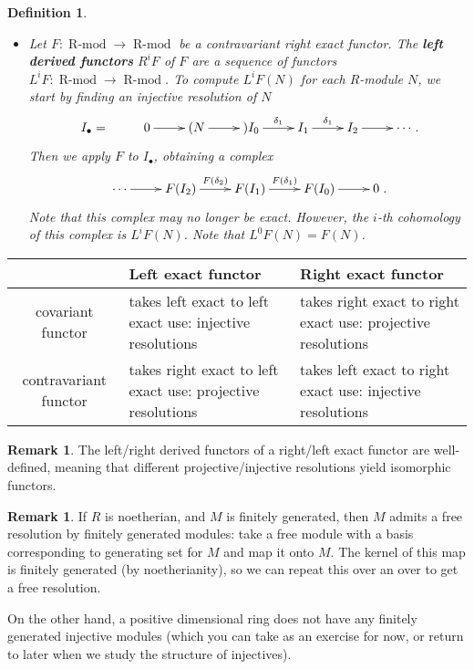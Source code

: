 \documentclass[11pt]{book}
\newtheorem{definition}[theorem]{Definition}
\numberwithin{equation}{section}
\numberwithin{theorem}{chapter}
\theoremstyle{definition}
\newtheorem*{basic properties}{Basic Properties}
\newtheorem*{Important Remark}{Important Remark}
\newtheorem{remark}[theorem]{Remark}
\theoremstyle{remark}
\newcommand{\Rmod}{\operatorname{R-mod}}
\begin{document}
\begin{definition}
\begin{itemize}
	
	\item Let $F\!: \Rmod \longrightarrow \Rmod$ be a contravariant right exact functor. The {\bf left derived functors} $R^iF$ of $F$ are a sequence of functors $L^iF\!:  \Rmod \longrightarrow \Rmod$. To compute $L^iF(N)$ for each $R$-module $N$, we start by finding an injective resolution of $N$
	$$\xymatrix{I_\bullet = & 0 \ar[r] & (N \ar[r] &) I_{0} \ar[r]^-{\delta_{1}} & I_1 \ar[r]^{\delta_1} & I_{2} \ar[r] & \cdots}.$$
	Then we apply $F$ to $I_{\bullet}$, obtaining a complex
	$$\xymatrix{\cdots \ar[r] & F(I_{2}) \ar[r]^-{F(\delta_{2})} & F(I_1) \ar[r]^{F(\delta_1)} & F(I_{0}) \ar[r] & 0}.$$
	Note that this complex may no longer be exact. However, the $i$-th cohomology of this complex is $L^iF(N)$. Note that $L^0F(N) = F(N)$.
\end{itemize}
\end{definition}

\vskip 7mm

\begin{tabular}{| c | p{50mm} | p{55mm} |}
\hline
 & Left exact functor & Right exact functor \\ 
 \hline
covariant functor & takes left exact to left exact use: injective resolutions & takes right exact to right exact use: projective resolutions \\  
\hline
contravariant functor & takes right exact to left exact use: projective resolutions & takes left exact to right exact \quad use: injective resolutions \\
\hline
\end{tabular}


\vskip 10mm



\begin{remark}
	The left/right derived functors of a right/left exact functor are well-defined, meaning that different projective/injective resolutions yield isomorphic functors. 
\end{remark}

\begin{remark}
	If $R$ is noetherian, and $M$ is finitely generated, then $M$ admits a free resolution by finitely generated modules: take a free module with a basis corresponding to generating set for $M$ and map it onto $M$. The kernel of this map is finitely generated (by noetherianity), so we can repeat this over an over to get a free resolution.

On the other hand, a positive dimensional ring does not have any finitely generated injective modules (which you can take as an exercise for now, or return to later when we study the structure of injectives).
\end{remark}
\end{document}
